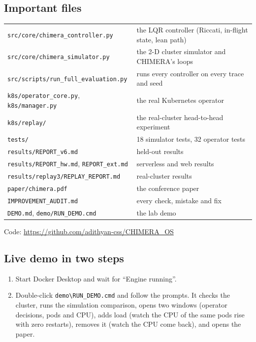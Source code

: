 \documentclass[11pt,a4paper]{article}
\begin{document}
\subsection{Important files}
\begin{center}
\begin{tabular}{@{}lp{10.2cm}@{}}
\toprule
\texttt{src/core/chimera\_controller.py} & the LQR controller (Riccati, in-flight state, lean path) \\
\texttt{src/core/chimera\_simulator.py} & the 2-D cluster simulator and CHIMERA's loops \\
\texttt{src/scripts/run\_full\_evaluation.py} & runs every controller on every trace and seed \\
\texttt{k8s/operator\_core.py}, \texttt{k8s/manager.py} & the real Kubernetes operator \\
\texttt{k8s/replay/} & the real-cluster head-to-head experiment \\
\texttt{tests/} & 18 simulator tests, 32 operator tests \\
\texttt{results/REPORT\_v6.md} & held-out results \\
\texttt{results/REPORT\_hw.md}, \texttt{REPORT\_ext.md} & serverless and web results \\
\texttt{results/replay3/REPLAY\_REPORT.md} & real-cluster results \\
\texttt{paper/chimera.pdf} & the conference paper \\
\texttt{IMPROVEMENT\_AUDIT.md} & every check, mistake and fix \\
\texttt{DEMO.md}, \texttt{demo/RUN\_DEMO.cmd} & the lab demo \\
\bottomrule
\end{tabular}
\end{center}
Code: \url{https://github.com/adithyan-css/CHIMERA_OS}

\subsection{Live demo in two steps}
\begin{enumerate}
\item Start Docker Desktop and wait for ``Engine running''.
\item Double-click \texttt{demo\textbackslash RUN\_DEMO.cmd} and follow the prompts. It
checks the cluster, runs the simulation comparison, opens two windows (operator decisions,
pods and CPU), adds load (watch the CPU of the same pods rise with zero restarts), removes
it (watch the CPU come back), and opens the paper.
\end{enumerate}
\end{document}
